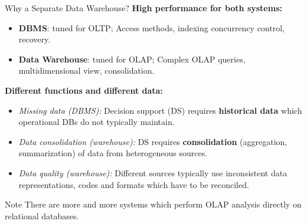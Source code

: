 \begin{frame}{Why a Separate Data Warehouse?}
	\textbf{High performance for both systems:}
	\begin{itemize}
		\item \textbf{\color{airforceblue}DBMS}: tuned for OLTP; Access methods,
		      indexing concurrency control, recovery.
		\item \textbf{\color{airforceblue}Data Warehouse}: tuned for OLAP; Complex OLAP
		      queries, multidimensional view, consolidation.
	\end{itemize}
	\textbf{Different functions and different data:}
	\begin{itemize}
		\item \textit{Missing data (DBMS):} Decision support (DS) requires \textbf{\color{airforceblue}historical data} which operational DBs do not typically maintain.
		\item \textit{Data consolidation (warehouse):} DS requires \textbf{\color{airforceblue}consolidation} (aggregation, summarization) of data from heterogeneous sources.
		\item \textit{Data quality (warehouse):} Different sources typically use inconsistent data representations, codes and formats which have to be reconciled.
	\end{itemize}

	\begin{alertblock}{Note}
		There are more and more systems which perform OLAP analysis directly on relational databases.
	\end{alertblock}
\end{frame}

